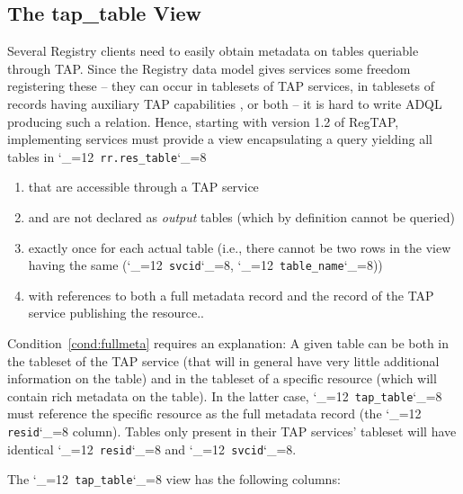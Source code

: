 \documentclass[11pt,a4paper]{ivoa}
\makeatletter
\def\rtent#1{\texttt{\color{rtcolor}\verb|#1|}}
\def\makeunderscoreletter{\catcode`\_=12}
\def\makeunderscoresubscript{\catcode`\_=8}
\def\rtent{\makeunderscoreletter\relax\rt@nt}
\def\rt@nt#1{\texttt{\color{rtcolor} #1}\makeunderscoresubscript{}}
\makeatother
\begin{document}
\subsection{The tap\_table View}
\label{table_tap_table}

Several Registry clients need to easily obtain metadata on tables
queriable through TAP.  Since the Registry data model gives services
some freedom registering these -- they can occur in tablesets of TAP
services, in tablesets of records having auxiliary TAP capabilities
\citep{2019ivoa.spec.0520D}, or both -- it is hard to write ADQL
producing such a relation.  Hence, starting with version 1.2 of RegTAP,
implementing
services must provide a view encapsulating a query yielding all tables
in \rtent{rr.res_table}

\begin{enumerate}
\item that are accessible through a TAP service
\item and are not declared as \emph{output} tables (which by definition
cannot be queried)
\item exactly once for each actual table (i.e., there cannot be two rows
in the view having the same (\rtent{svcid}, \rtent{table_name}))
\item with references to both a full metadata record and the record of
the TAP service publishing the resource.\label{cond:fullmeta}.
\end{enumerate}

Condition~\ref{cond:fullmeta} requires an explanation: A given table can
be both in the tableset of the TAP service (that will in general have
very little additional information on the table) and in the tableset of
a specific resource (which will contain rich metadata on the table).  In
the latter case, \rtent{tap_table} must reference the specific resource
as the full metadata record (the \rtent{resid} column).  Tables only
present in their TAP services' tableset will have identical
\rtent{resid} and \rtent{svcid}.

The \rtent{tap_table} view has the following columns:


\end{document}

